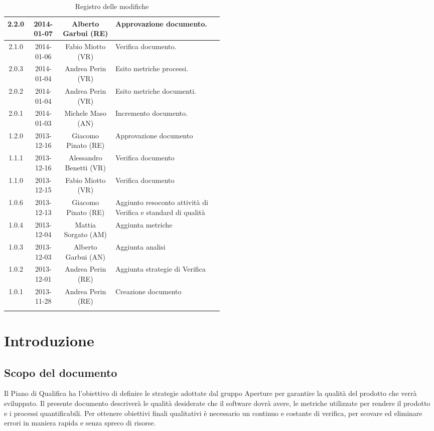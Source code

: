 \begin{center}
\begin{longtable}{|c|c|c|p{0.5\linewidth}|}
\midrule
2.2.0 & 2014-01-07 & Alberto Garbui (RE) & Approvazione documento.\\
\midrule
2.1.0 & 2014-01-06 & Fabio Miotto (VR) & Verifica documento.\\
\midrule
2.0.3 & 2014-01-04 & Andrea Perin (VR) & Esito metriche processi.\\
\midrule
2.0.2 & 2014-01-04  & Andrea Perin (VR) & Esito metriche documenti.\\
\midrule
2.0.1 & 2014-01-03  & Michele Maso (AN) & Incremento documento.\\

\midrule
1.2.0 & 2013-12-16 & Giacomo Pinato (RE) & Approvazione documento\\
\midrule
1.1.1 & 2013-12-16 & Alessandro Benetti (VR) & Verifica documento\\
\midrule
1.1.0 & 2013-12-15 & Fabio Miotto (VR) & Verifica documento\\
\midrule
1.0.6 & 2013-12-13 & Giacomo Pinato (RE) & Aggiunto resoconto attività di Verifica e standard di qualità\\
\midrule
1.0.4 & 2013-12-04 & Mattia Sorgato (AM) & Aggiunta metriche\\
\midrule
1.0.3 & 2013-12-03 & Alberto Garbui (AN) & Aggiunta analisi\\
\midrule
1.0.2 & 2013-12-01 & Andrea Perin (RE) & Aggiunta strategie di Verifica\\
\midrule
1.0.1 & 2013-11-28 & Andrea Perin (RE) & Creazione documento\\

\bottomrule
\caption{Registro delle modifiche}
\label{tab:changelog}
\end{longtable}
\end{center}

\newpage
\tableofcontents

\newpage
\listoftables
\listoffigures

\newpage
\section{Introduzione}%
\label{1.0}
\subsection{Scopo del documento}%
\label{1.1}
Il Piano di Qualifica ha l'obiettivo di definire le strategie adottate dal gruppo Aperture  per garantire la qualità del prodotto che verrà sviluppato.
Il presente documento descriverà le qualità desiderate che il software dovrà avere, le metriche utilizzate per rendere il prodotto e i processi quantificabili. Per ottenere obiettivi finali qualitativi è necessario un continuo e costante  di verifica, per scovare ed eliminare errori in maniera rapida e senza spreco di risorse.

